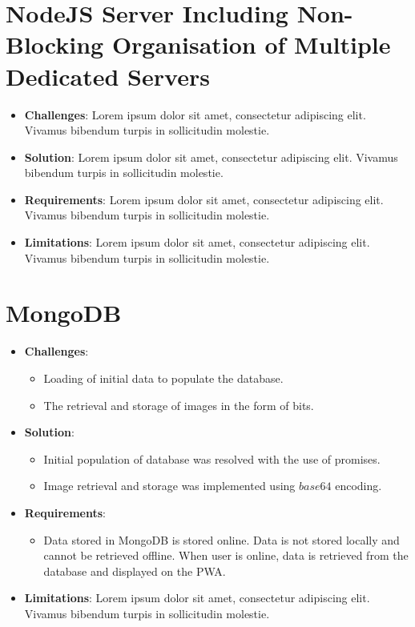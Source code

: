 \documentclass[11pt, a4paper]{article}
\begin{document}
\section{NodeJS Server Including Non-Blocking Organisation of Multiple Dedicated Servers}
\begin{itemize}
  \item \textbf{Challenges}: Lorem ipsum dolor sit amet, consectetur adipiscing elit. Vivamus
  bibendum turpis in sollicitudin molestie.
  \item \textbf{Solution}: Lorem ipsum dolor sit amet, consectetur adipiscing elit. Vivamus bibendum
  turpis in sollicitudin molestie.
  \item \textbf{Requirements}: Lorem ipsum dolor sit amet, consectetur adipiscing elit. Vivamus
  bibendum turpis in sollicitudin molestie.
  \item \textbf{Limitations}: Lorem ipsum dolor sit amet, consectetur adipiscing elit. Vivamus
  bibendum turpis in sollicitudin molestie.
\end{itemize}

\section{MongoDB}
\begin{itemize}
  \item \textbf{Challenges}:
  \begin{itemize}
    \item Loading of initial data to populate the database. 
    \item The retrieval and storage of images in the form of bits.
  \end{itemize}
  \item \textbf{Solution}: 
  \begin{itemize}
    \item Initial population of database was resolved with the use of promises. 
    \item Image retrieval and storage was implemented using $base64$ encoding.
  \end{itemize}
  \item \textbf{Requirements}:
  \begin{itemize}
    \item Data stored in MongoDB is stored online. Data is not stored locally and cannot be retrieved offline. When user is online, data is retrieved from the database and displayed on the PWA.
  \end{itemize}
  \item \textbf{Limitations}: Lorem ipsum dolor sit amet, consectetur adipiscing elit. Vivamus
  bibendum turpis in sollicitudin molestie.
\end{itemize}
\end{document}
